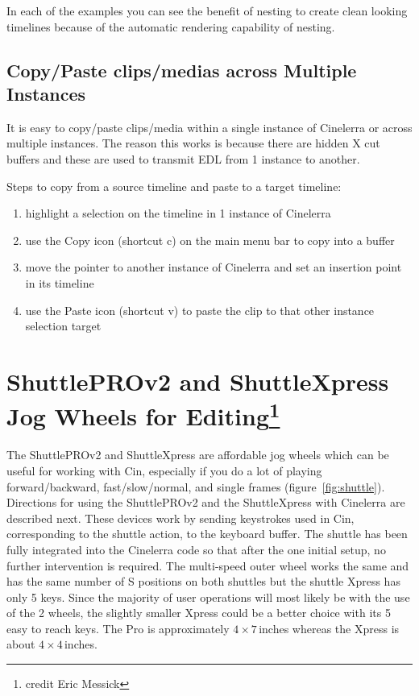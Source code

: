 In each of the examples you can see the benefit of nesting to create clean
looking timelines because of the automatic rendering capability of nesting.

\subsection{Copy/Paste clips/medias across Multiple Instances}%
\label{sub:copy_paste_multiple_instances}

It is easy to copy/paste clips/media within a single instance of Cinelerra or across multiple instances.  The reason this works is because there are hidden X cut buffers and these are used to transmit EDL from 1 instance to another.

\noindent Steps to copy from a source timeline and paste to a target timeline:

\begin{enumerate}
    \item highlight a selection on the timeline in 1 instance of Cinelerra
    \item use the Copy icon (shortcut c)  on the main menu bar to copy into a buffer
    \item move the pointer to another instance of Cinelerra and set an insertion point in its timeline
    \item use the Paste icon (shortcut v) to paste the clip to that other instance selection target
\end{enumerate}

\section[ShuttlePROv2 and ShuttleXpress Jog Wheels for Editing]{ShuttlePROv2 and ShuttleXpress Jog Wheels for Editing\protect\footnote{credit Eric Messick}}%
\label{sec:shuttle_jog_wheels_editing}


The ShuttlePROv2 and ShuttleXpress are affordable jog wheels which can be useful for working with Cin, especially if you do a lot of playing forward/backward, fast/slow/normal, and single frames (figure~\ref{fig:shuttle}).
Directions for using the ShuttlePROv2 and the ShuttleXpress with Cinelerra are described next. These devices work by sending keystrokes used in Cin, corresponding to the shuttle action, to the keyboard buffer. The shuttle has been fully integrated into the Cinelerra code so that after the one initial setup, no further intervention is required.  The multi-speed outer wheel works the same and has the same number of S positions on both shuttles but the shuttle Xpress has only 5 keys.  Since the majority of user operations will most likely be with the use of the 2 wheels, the slightly smaller Xpress could be a better choice with its 5 easy to reach keys.  The Pro is approximately $4\times7$\,inches whereas the Xpress is about $4\times4$\,inches.

